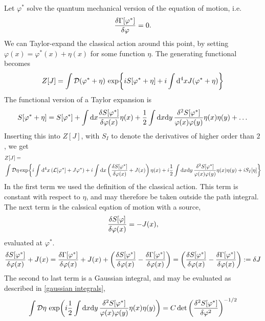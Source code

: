 Let $\varphi^*$ solve the quantum mechanical version of the equation of motion, i.e.
\begin{equation}
    \fdv{\Gamma[\varphi^*]}{\varphi} = 0.
\end{equation}
We can Taylor-expand the classical action around this point, by setting $\varphi(x) = \varphi^*(x) + \eta(x)$ for some function $\eta$.
The generating functional becomes
\begin{align}
    Z[J] 
    = \int \mathcal{D} (\varphi^* + \eta) \, 
    \exp{i S[\varphi^* + \eta] + i \int \dd^4 x J (\varphi^* + \eta) }
\end{align}
The functional version of a Taylor expansion is
\begin{equation}
    S[\varphi^* + \eta] = 
    S[\varphi^*]
    + \int \dd x \fdv{S[\varphi^*]}{\varphi(x)} \eta(x)
    + \frac{1}{2} \int \dd x \dd y\,  \frac{\delta^2 S[\varphi^*]}{\varphi(x)\varphi(y)} \eta(x) \eta(y)
    + \dots
\end{equation}
Inserting this into $Z[J]$, with $S_I$ to denote the derivatives of higher order than $2$, we get
\begin{align*}
    &Z[J] = \\ 
    &\int \D \eta  
    \exp{
        i \int \dd^4 x \left(  \Ell[\varphi^*] + J \varphi^*  \right)
        + i \int \dd x \left(  \fdv{S[\varphi^*]}{\varphi(x)} + J(x) \right) \eta(x)
        + i \frac{1}{2} \int \dd x \dd y\,  \frac{\delta^2 S[\varphi^*]}{\varphi(x)\varphi(y)} \eta(x) \eta(y) 
        + i S_I[\eta]
        }
\end{align*}
In the first term we used the definition of the classical action. This term is constant with respect to $\eta$, and may therefore be taken outside the path integral.
The next term is the calssical eqation of motion with a source, 
\begin{equation}
    \fdv{S[\varphi]}{\varphi(x)} = - J(x),
\end{equation} 
evaluated at $\varphi^*$.
\begin{equation}
    \fdv{S[\varphi^*]}{\varphi(x)} + J(x)
    = \fdv{\Gamma[\varphi^*]}{\varphi(x)} + J(x)
    + \left(\fdv{S[\varphi^*]}{\varphi(x)} - \fdv{\Gamma[\varphi^*]}{\varphi(x)} \right)
    = \left(\fdv{S[\varphi^*]}{\varphi(x)} - \fdv{\Gamma[\varphi^*]}{\varphi(x)} \right)
    := \delta J
\end{equation}
The second to last term is a Gaussian integral, and may be evaluated as described in \autoref{gaussian integrals},
\begin{equation}
    \int \mathcal{D} \eta \, \exp(
        i \frac{1}{2} \int \dd x \dd y\,  
        \frac{\delta^2 S[\varphi^*]}{\varphi(x)\varphi(y)} \eta(x) \eta(y)
        )
        = C \det\left( \frac{\delta^2 S[\varphi^*]}{\delta \varphi^2} \right)^{-1/2}
\end{equation}
